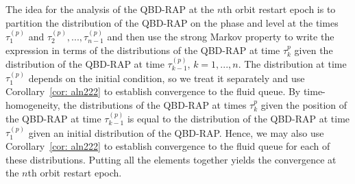 
The idea for the analysis of the QBD-RAP at the \(n\)th orbit restart epoch is to partition the distribution of the QBD-RAP on the phase and level at the times \(\tau_1^{(p)}\) and \(\tau_2^{(p)},...,\tau_{n-1}^{(p)}\) and then use the strong Markov property to write the expression in terms of the distributions of the QBD-RAP at time \(\tau_k^{p}\) given the distribution of the QBD-RAP at time \(\tau_{k-1}^{(p)}\), \(k=1,...,n\). The distribution at time \(\tau_1^{(p)}\) depends on the initial condition, so we treat it separately and use Corollary~\ref{cor: aln222} to establish convergence to the fluid queue. By time-homogeneity, the distributions of the QBD-RAP at times \(\tau_k^{p}\) given the position of the QBD-RAP at time \(\tau_{k-1}^{(p)}\) is equal to the distribution of the QBD-RAP at time \(\tau_1^{(p)}\) given an initial distribution of the QBD-RAP. Hence, we may also use Corollary~\ref{cor: aln222} to establish convergence to the fluid queue for each of these distributions. Putting all the elements together yields the convergence at the \(n\)th orbit restart epoch.

